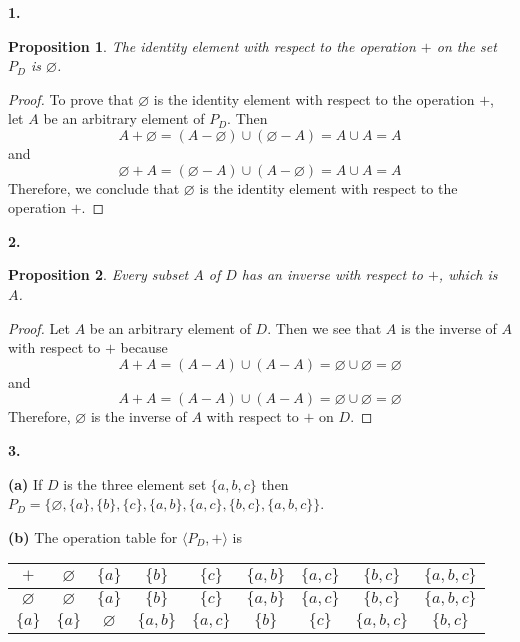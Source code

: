 \documentclass[12pt]{article}   %
\newtheorem*{proposition}{Proposition}  %
\let\emptyset\varnothing
\begin{document}
\bigskip

\noindent\textbf{1.} 
\begin{proposition}
The identity element with respect to the operation $+$ on the set $P_D$ is $\emptyset$.
\end{proposition}
\begin{proof}
To prove that $\emptyset$ is the identity element with respect to the operation $+$, let $A$ be an arbitrary element of $P_D$. Then
\begin{equation*}
A + \emptyset = (A - \emptyset) \cup (\emptyset - A) = A \cup A = A
\end{equation*}
and
\begin{equation*}
\emptyset + A = (\emptyset - A) \cup (A - \emptyset) = A \cup A = A
\end{equation*}
Therefore, we conclude that $\emptyset$ is the identity element with respect to the operation $+$.
\end{proof}


\bigskip
\noindent\textbf{2.}
\begin{proposition}
Every subset $A$ of $D$ has an inverse with respect to $+$, which is $A$.
\end{proposition}
\begin{proof}
Let $A$ be an arbitrary element of $D$. Then we see that $A$ is the inverse of $A$ with respect to $+$ because
\begin{equation*}
A + A = (A - A) \cup (A - A) = \emptyset \cup \emptyset = \emptyset
\end{equation*}
and
\begin{equation*}
A + A = (A - A) \cup (A - A) = \emptyset \cup \emptyset = \emptyset
\end{equation*}
Therefore, $\emptyset$ is the inverse of $A$ with respect to $+$ on $D$.
\end{proof}

\bigskip
\noindent\textbf{3.} 

\smallskip
\noindent\textbf{(a)} If $D$ is the three element set $\{a,b,c\}$ then $P_D = \{\emptyset, \{a\}, \{b\}, \{c\}, \{a,b\}, \{a,c\}, \{b,c\}, \{a,b,c\} \}$.

\bigskip
\noindent\textbf{(b)}
The operation table for $\langle P_D, + \rangle$ is \\

\begin{tabular}{c | c c c c c c c c}
$+$ & $\emptyset$ & $\{a\}$ & $\{b\}$ & $\{c\}$ & $\{a,b\}$ & $\{a,c\}$ & $\{b,c\}$ & $\{a,b,c\}$ \\
\hline
$\emptyset$ & $\emptyset$ & $\{a\}$ & $\{b\}$ & $\{c\}$ & $\{a,b\}$ & $\{a,c\}$ & $\{b,c\}$ & $\{a,b,c\}$ \\
$\{a\}$ & $\{a\}$ & $\emptyset$ & $\{a,b\}$ & $\{a,c\}$ & $\{b\}$ & $\{c\}$ & $\{a,b,c\}$ & $\{b,c\}$ \\
\end{tabular}
\end{document}
